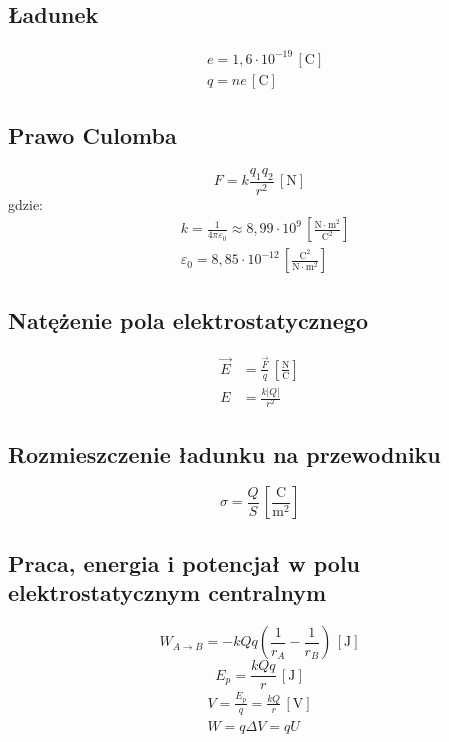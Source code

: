 \documentclass{article}
\numberwithin{equation}{section}
\newcommand{\unit}[1]{\, \left[\mathrm{#1}\right]}
\begin{document}
    \subsection{Ładunek}
      \begin{align}
        &e = 1,6\cdot 10^{-19} \unit{C}\\
        &q = ne \unit{C}
      \end{align}
    \subsection{Prawo Culomba}
      \begin{equation}
        F = k\frac{q_1q_2}{r^2} \unit{N}
      \end{equation}
      gdzie:
      \begin{align}
        &k = \frac{1}{4\pi\varepsilon_0} \approx 8,99\cdot 10^9 \unit{\frac{N\cdot m^2}{C^2}}\\
        &\varepsilon_0 = 8,85\cdot 10^{-12} \unit{\frac{C^2}{N\cdot m^2}}
      \end{align}
    \subsection{Natężenie pola elektrostatycznego}
      \begin{align}
        \vec E &= \frac{\vec F}{q} \unit{\frac{N}{C}}\\
        E &= \frac{k|Q|}{r^2}
      \end{align}
    \subsection{Rozmieszczenie ładunku na przewodniku}
      \begin{equation}
        \sigma = \frac{Q}{S} \unit{\frac{C}{m^2}}
      \end{equation}
    \subsection{Praca, energia i potencjał w polu elektrostatycznym centralnym}
      \begin{equation}
        W_{A\rightarrow B} = -kQq\left(\frac{1}{r_A} - \frac{1}{r_B}\right) \unit{J}
      \end{equation}
      \begin{equation}
        E_p = \frac{kQq}{r} \unit{J}
      \end{equation}
      \begin{align}
        V = \frac{E_p}{q} = \frac{kQ}{r} \unit{V}\\
        W = q\Delta V = qU
      \end{align}
\end{document}

